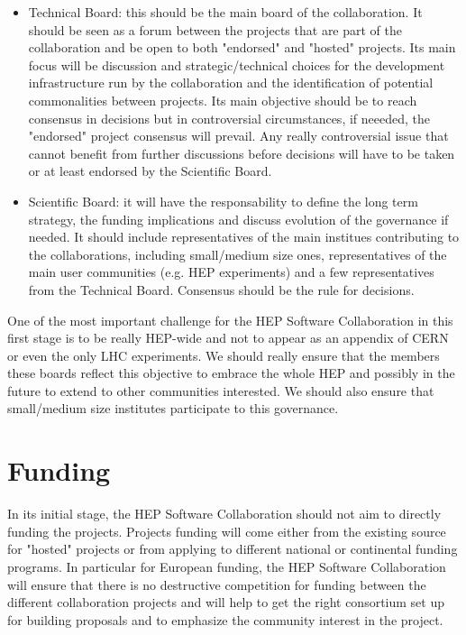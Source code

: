 \documentclass[11pt]{article} %
\begin{document}
\begin{itemize}

\item Technical Board: this should be the main board of the collaboration. It should be seen as a forum between the projects that are part
of the collaboration and be open to both "endorsed" and "hosted" projects. Its main focus will be discussion and strategic/technical choices for 
the development infrastructure run by the collaboration and the identification of potential commonalities between projects. Its main objective should
be to reach consensus in decisions but in controversial circumstances, if neeeded, the "endorsed" project consensus will prevail. Any really controversial
issue that cannot benefit from further discussions before decisions will have to be taken or at least endorsed by the Scientific Board.

\item Scientific Board: it will have the responsability to define the long term strategy, the funding implications and discuss evolution of the governance if
needed. It should include representatives of the main institues contributing to the collaborations, including small/medium size ones, representatives of the main
user communities (e.g. HEP experiments) and a few representatives from the Technical Board. Consensus should be the rule for decisions.

\end{itemize}

One of the most important challenge for the HEP Software Collaboration in this first stage is to be really HEP-wide and not
to appear as an appendix of CERN or even the only LHC experiments. We should really ensure that the members these
boards reflect this objective to embrace the whole HEP and possibly in the future to extend to other communities interested.
We should also ensure that small/medium size institutes participate to this governance.


\section{Funding}

In its initial stage, the HEP Software Collaboration should not aim to directly funding the projects. Projects funding will come
either from the existing source for "hosted" projects or from applying to different national or continental funding programs. In
particular for European funding, the HEP Software Collaboration will ensure that there is no destructive competition for funding
between the different collaboration projects and will help to get the right consortium set up for building proposals and to emphasize 
the community interest in the project.
\end{document}
